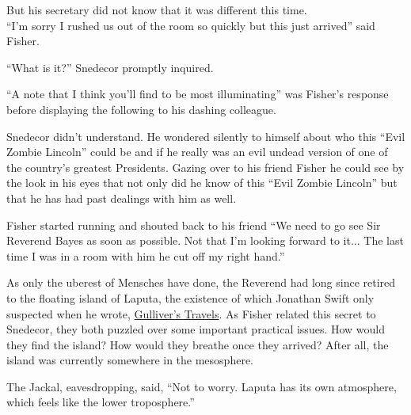 \documentclass{article}
\begin{document}
But his secretary did not know that it was different this time.\\


``I'm sorry I rushed us out of the room so quickly but this just arrived'' said Fisher. 

``What is it?'' Snedecor promptly inquired.

``A note that I think you'll find to be most illuminating'' was Fisher's response before displaying the following to his dashing colleague.


\Fontauri
\Large 
\begin{center}
\end{center}


\normalfont
\normalsize
\vspace{.5in}

Snedecor didn't understand.  He wondered silently to himself about who this ``Evil Zombie Lincoln'' could be and if he really was an evil undead version of one of the country's greatest Presidents.  Gazing over to his friend Fisher he could see by the look in his eyes that not only did he know of this ``Evil Zombie Lincoln'' but that he has had past dealings with him as well.

Fisher started running and shouted back to his friend ``We need to go see Sir Reverend Bayes as soon as possible.  Not that I'm looking forward to it... The last time I was in a room with him he cut off my right hand.''


As only the uberest of Mensches have done, the Reverend had long since retired to the floating island of Laputa, the existence of which Jonathan Swift only suspected when he wrote, \underline{Gulliver's Travels}. As Fisher related this secret to Snedecor, they both puzzled over some important practical issues. How would they find the island? How would they breathe once they arrived? After all, the island was currently somewhere in the mesosphere. \newline

The Jackal, eavesdropping, said, ``Not to worry. Laputa has its own atmosphere, which feels like the lower troposphere.'' \newline
\end{document}
